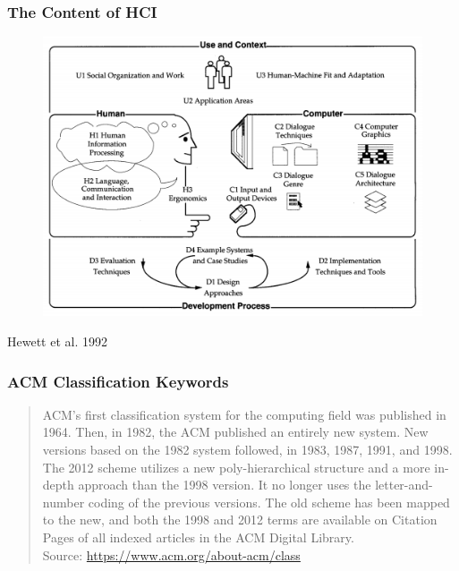 \documentclass[screen, aspectratio=43]{beamer}
\begin{document}
%
\begin{frame}
\frametitle{The Content of HCI}
\begin{figure}
\includegraphics[scale=0.20]{img/content-HCI-1992.png}
\end{figure}
{\small Hewett et al. 1992 \cite{Hewett.1992.curricula}}
\end{frame}
%
\begin{frame}
\frametitle{ACM Classification Keywords}
\begin{quote}
ACM's first classification system for the computing field was published in 1964. Then, in 1982, the ACM published an entirely new system. New versions based on the 1982 system followed, in 1983, 1987, 1991, and 1998. The 2012 scheme utilizes a new poly-hierarchical structure and a more in-depth approach than the 1998 version. It no longer uses the letter-and-number coding of the previous versions. The old scheme has been mapped to the new, and both the 1998 and 2012 terms are available on Citation Pages of all indexed articles in the ACM Digital Library.\\
Source: \url{https://www.acm.org/about-acm/class}
\end{quote}
\end{frame}
%
\end{document}
